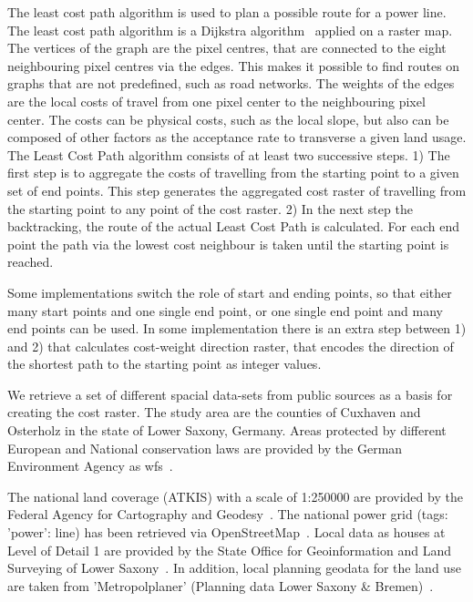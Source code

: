 
The least cost path algorithm is used to plan a possible route for a power line.
The least cost path algorithm is a Dijkstra algorithm~\cite{dijkstra_note_1959} applied on a raster map.
The vertices of the graph are the pixel centres, that are connected to the eight neighbouring pixel centres via the edges.
This makes it possible to find routes on graphs that are not predefined, such as road networks.
The weights of the edges are the local costs of travel from one pixel center to the neighbouring pixel center.
The costs can be physical costs, such as the local slope, but also can be composed of other factors as the acceptance rate to transverse a given land usage.
The Least Cost Path algorithm consists of at least two successive steps.
1) The first step is to aggregate the costs of travelling from the starting point to a given set of end points.
This step generates the aggregated cost raster of travelling from the starting point to any point of the cost raster.
2) In the next step the backtracking, the route of the actual Least Cost Path is calculated.
For each end point the path via the lowest cost neighbour is taken until the starting point is reached.

Some implementations switch the role of start and ending points, so that either many start points and one single end point, or one single end point and many end points can be used.
In some implementation there is an extra step between 1) and 2) that calculates cost-weight direction raster, that encodes the direction of the shortest
path to the starting point as integer values.

We retrieve a set of different spacial data-sets from  public sources as a basis for creating the cost raster.
The study area are the counties of Cuxhaven and Osterholz in the state of Lower Saxony, Germany.
Areas protected by different European and National conservation laws are provided by the German Environment Agency
as \acrfull{wfs}~\cite{noauthor_schutzgebiete_2015}.

The national land coverage (ATKIS) with a scale of 1:250000 are provided by the Federal Agency for Cartography
and Geodesy~\cite{noauthor_digitales_2021}.
The national power grid (tags: 'power': line) has been retrieved via OpenStreetMap~\cite{boeing_osmnx_2017}.
Local data as houses at Level of Detail 1 are provided by the State Office for Geoinformation and Land Surveying of
Lower Saxony~\cite{noauthor_opengeodatani_2022}.
In addition, local planning geodata for the land use are taken
from 'Metropolplaner' (Planning data Lower Saxony \& Bremen)~\cite{noauthor_metropolplaner_2022}.

